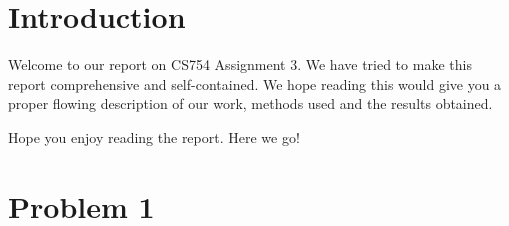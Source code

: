 \documentclass[a4paper,11pt]{article}
\numberwithin{definition}{section}
\numberwithin{mytheorem}{subsection}
\begin{document}

\date{Spring 2022}
\maketitle

\justifying
\tableofcontents

\newpage
\justifying
\section*{Introduction}

Welcome  to our report on CS754 Assignment 3. We have tried to make this report comprehensive and self-contained. We hope reading this would give you a proper flowing description of our work, methods used and the results obtained.

Hope you enjoy reading the report. Here we go!


\section{Problem 1}
\end{document}
